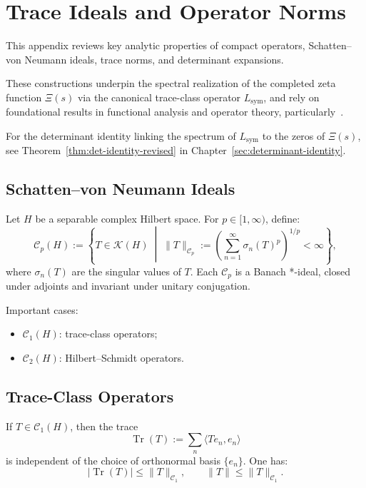 \section{Trace Ideals and Operator Norms}
\label{app:trace-ideals-review}

This appendix reviews key analytic properties of compact operators, Schatten–von Neumann ideals, trace norms, and determinant expansions.

These constructions underpin the spectral realization of the completed zeta function \( \Xi(s) \) via the canonical trace-class operator \( L_{\mathrm{sym}} \), and rely on foundational results in functional analysis and operator theory, particularly~\cite{Simon2005TraceIdeals, ReedSimon1980I, ReedSimon1975II}.

For the determinant identity linking the spectrum of \( L_{\mathrm{sym}} \) to the zeros of \( \Xi(s) \), see Theorem~\ref{thm:det-identity-revised} in Chapter~\ref{sec:determinant-identity}.

\subsection*{Schatten–von Neumann Ideals}

Let \( H \) be a separable complex Hilbert space. For \( p \in [1, \infty) \), define:
\[
\mathcal{C}_p(H) := \left\{ T \in \mathcal{K}(H) \;\middle|\; \|T\|_{\mathcal{C}_p} := \left( \sum_{n=1}^\infty \sigma_n(T)^p \right)^{1/p} < \infty \right\},
\]
where \( \sigma_n(T) \) are the singular values of \( T \). Each \( \mathcal{C}_p \) is a Banach *-ideal, closed under adjoints and invariant under unitary conjugation.

\medskip
Important cases:
\begin{itemize}
  \item \( \mathcal{C}_1(H) \): trace-class operators;
  \item \( \mathcal{C}_2(H) \): Hilbert–Schmidt operators.
\end{itemize}

\subsection*{Trace-Class Operators}

If \( T \in \mathcal{C}_1(H) \), then the trace
\[
\operatorname{Tr}(T) := \sum_n \langle T e_n, e_n \rangle
\]
is independent of the choice of orthonormal basis \( \{ e_n \} \). One has:
\[
|\operatorname{Tr}(T)| \le \|T\|_{\mathcal{C}_1}, \qquad \|T\| \le \|T\|_{\mathcal{C}_1}.
\]

